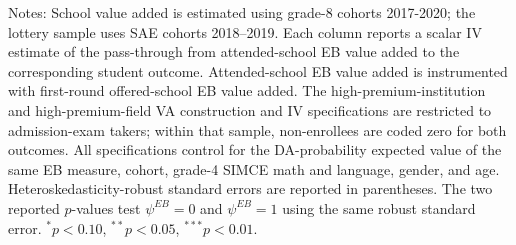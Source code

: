 \begin{table}[!htbp]
\centering
\caption{Pass-through coefficients for the main EB school-value specifications}
\label{tab:scalar-school-value-iv-main-seven-eb-va-2017-2020-sae-2018-2019}
\par\medskip
\footnotesize
\begin{minipage}{\textwidth}
Notes: School value added is estimated using grade-8 cohorts 2017-2020; the lottery sample uses SAE cohorts 2018--2019. Each column reports a scalar IV estimate of the pass-through from attended-school EB value added to the corresponding student outcome. Attended-school EB value added is instrumented with first-round offered-school EB value added. The high-premium-institution and high-premium-field VA construction and IV specifications are restricted to admission-exam takers; within that sample, non-enrollees are coded zero for both outcomes. All specifications control for the DA-probability expected value of the same EB measure, cohort, grade-4 SIMCE math and language, gender, and age. Heteroskedasticity-robust standard errors are reported in parentheses. The two reported $p$-values test $\psi^{EB}=0$ and $\psi^{EB}=1$ using the same robust standard error. $^{*}p<0.10$, $^{**}p<0.05$, $^{***}p<0.01$.
\end{minipage}
\end{table}
